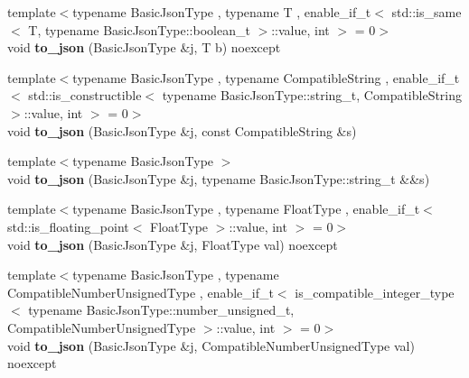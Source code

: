 \begin{DoxyCompactItemize}
\item 
\mbox{\label{namespacenlohmann_1_1detail_a1a804b98cbe89b7e44b698f2ca860490}} 
{\footnotesize template$<$typename Basic\+Json\+Type , typename T , enable\+\_\+if\+\_\+t$<$ std\+::is\+\_\+same$<$ T, typename Basic\+Json\+Type\+::boolean\+\_\+t $>$\+::value, int $>$  = 0$>$ }\\void {\bfseries to\+\_\+json} (Basic\+Json\+Type \&j, T b) noexcept
\item 
\mbox{\label{namespacenlohmann_1_1detail_a7356ed05cdbbb080cee80e1211e1c6c9}} 
{\footnotesize template$<$typename Basic\+Json\+Type , typename Compatible\+String , enable\+\_\+if\+\_\+t$<$ std\+::is\+\_\+constructible$<$ typename Basic\+Json\+Type\+::string\+\_\+t, Compatible\+String $>$\+::value, int $>$  = 0$>$ }\\void {\bfseries to\+\_\+json} (Basic\+Json\+Type \&j, const Compatible\+String \&s)
\item 
\mbox{\label{namespacenlohmann_1_1detail_a4aa1ca6b7c61bf19d1f30ea5b669f68e}} 
{\footnotesize template$<$typename Basic\+Json\+Type $>$ }\\void {\bfseries to\+\_\+json} (Basic\+Json\+Type \&j, typename Basic\+Json\+Type\+::string\+\_\+t \&\&s)
\item 
\mbox{\label{namespacenlohmann_1_1detail_a22bffdc8bc7e43af380ba2050696b230}} 
{\footnotesize template$<$typename Basic\+Json\+Type , typename Float\+Type , enable\+\_\+if\+\_\+t$<$ std\+::is\+\_\+floating\+\_\+point$<$ Float\+Type $>$\+::value, int $>$  = 0$>$ }\\void {\bfseries to\+\_\+json} (Basic\+Json\+Type \&j, Float\+Type val) noexcept
\item 
\mbox{\label{namespacenlohmann_1_1detail_ae5fd66b5517b3b5a6c6b9fd9f29ba8dc}} 
{\footnotesize template$<$typename Basic\+Json\+Type , typename Compatible\+Number\+Unsigned\+Type , enable\+\_\+if\+\_\+t$<$ is\+\_\+compatible\+\_\+integer\+\_\+type$<$ typename Basic\+Json\+Type\+::number\+\_\+unsigned\+\_\+t, Compatible\+Number\+Unsigned\+Type $>$\+::value, int $>$  = 0$>$ }\\void {\bfseries to\+\_\+json} (Basic\+Json\+Type \&j, Compatible\+Number\+Unsigned\+Type val) noexcept

\end{DoxyCompactItemize}
